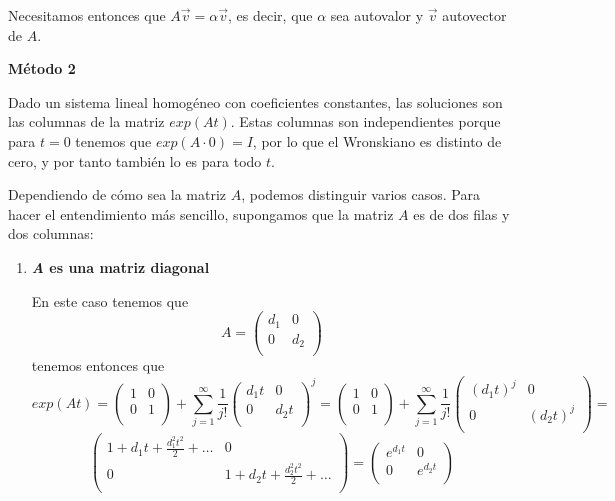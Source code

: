 \documentclass{mathnotes}
\begin{document}
Necesitamos entonces que $A\vec{v} = \alpha\vec{v}$, es decir, que $\alpha$ sea autovalor y $\vec{v}$ autovector de $A$.

\vspace{5mm}
\noindent\textbf{Método 2}

Dado un sistema lineal homogéneo con coeficientes constantes, las soluciones son las columnas de la matriz $exp(At)$. Estas columnas son independientes porque para $t=0$ tenemos que $exp(A\cdot0) = I$, por lo que el Wronskiano es distinto de cero, y por tanto también lo es para todo $t$.

Dependiendo de cómo sea la matriz $A$, podemos distinguir varios casos. Para hacer el entendimiento más sencillo, supongamos que la matriz $A$ es de dos filas y dos columnas:

\begin{enumerate}
\item \textbf{\textit{A} es una matriz diagonal}

En este caso tenemos que $$A = \begin{pmatrix}
d_1 & 0\\0 & d_2\\
\end{pmatrix}$$
tenemos entonces que $$exp(At) = \begin{pmatrix}
1 & 0\\ 0 & 1\\
\end{pmatrix} + \sum_{j=1}^\infty \frac{1}{j!} \begin{pmatrix}
d_1t & 0\\ 0 & d_2t\\
\end{pmatrix}^j = \begin{pmatrix}
1 & 0\\ 0 & 1\\
\end{pmatrix} + \sum_{j=1}^\infty \frac{1}{j!} \begin{pmatrix}
(d_1t)^j & 0\\ 0 & (d_2t)^j\\
\end{pmatrix} = $$
$$\begin{pmatrix}
1+d_1t+\frac{d_1^2t^2}{2}+\hdots & 0\\
0 & 1+d_2t+\frac{d_2^2t^2}{2}+\hdots\\
\end{pmatrix} = \begin{pmatrix}
e^{d_1t} & 0\\ 0 & e^{d_2t}\\
\end{pmatrix}$$


\end{enumerate}
\end{document}
